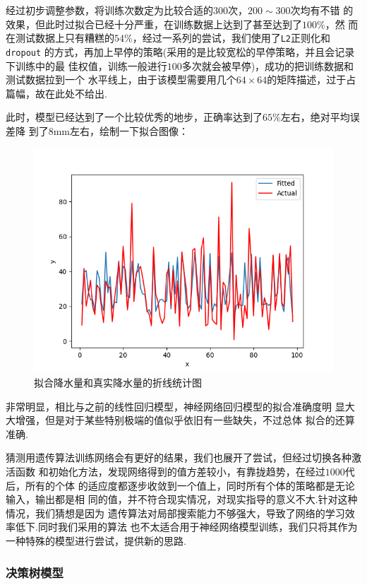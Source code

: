 \documentclass[UTF8, a4paper]{ctexart}
\begin{document}
经过初步调整参数，将训练次数定为比较合适的$300$次，$200\sim300$次均有不错
的效果，但此时过拟合已经十分严重，在训练数据上达到了甚至达到了$100\%$，然
而在测试数据上只有糟糕的$54\%$，经过一系列的尝试，我们使用了\verb+L2+正则化和\verb+dropout+
的方式，再加上早停的策略(采用的是比较宽松的早停策略，并且会记录下训练中的最
佳权值，训练一般进行$100$多次就会被早停)，成功的把训练数据和测试数据拉到一个
水平线上，由于该模型需要用几个$64\times64$的矩阵描述，过于占篇幅，故在此处不给出.

此时，模型已经达到了一个比较优秀的地步，正确率达到了$65\%$左右，绝对平均误差降
到了$8$\si{\milli\meter}左右，绘制一下拟合图像：

\begin{figure}[h!]
	\centering
	\includegraphics[scale=0.3]{success.png}
	\caption{拟合降水量和真实降水量的折线统计图}
\end{figure}

非常明显，相比与之前的线性回归模型，神经网络回归模型的拟合准确度明
显大大增强，但是对于某些特别极端的值似乎依旧有一些缺失，不过总体
拟合的还算准确.

猜测用遗传算法训练网络会有更好的结果，我们也展开了尝试，但经过切换各种激活函数
和初始化方法，发现网络得到的值方差较小，有靠拢趋势，在经过$1000$代后，所有的个体
的适应度都逐步收敛到一个值上，同时所有个体的策略都是无论输入，输出都是相
同的值，并不符合现实情况，对现实指导的意义不大.针对这种情况，我们猜想是因为
遗传算法对局部搜索能力不够强大，导致了网络的学习效率低下.同时我们采用的算法
也不太适合用于神经网络模型训练，我们只将其作为一种特殊的模型进行尝试，提供新的思路.

\subsubsection{决策树模型}
\end{document}

